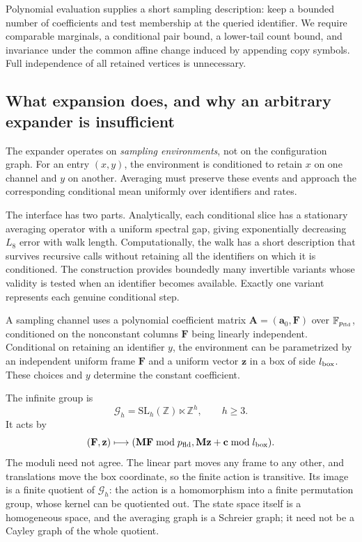 \documentclass[11pt]{article}
\numberwithin{equation}{section}
\theoremstyle{definition}
\theoremstyle{remark}
\begin{document}
Polynomial evaluation supplies a short sampling description: keep a bounded number of coefficients and test membership at the queried identifier. We require comparable marginals, a conditional pair bound, a lower-tail count bound, and invariance under the common affine change induced by appending copy symbols. Full independence of all retained vertices is unnecessary.

\subsection{What expansion does, and why an arbitrary expander is insufficient}

The expander operates on \emph{sampling environments}, not on the configuration graph. For an entry \((x,y)\), the environment is conditioned to retain \(x\) on one channel and \(y\) on another. Averaging must preserve these events and approach the corresponding conditional mean uniformly over identifiers and rates.

The interface has two parts. Analytically, each conditional slice has a stationary averaging operator with a uniform spectral gap, giving exponentially decreasing \(L_8\) error with walk length. Computationally, the walk has a short description that survives recursive calls without retaining all the identifiers on which it is conditioned. The construction provides boundedly many invertible variants whose validity is tested when an identifier becomes available. Exactly one variant represents each genuine conditional step.

A sampling channel uses a polynomial coefficient matrix \(\mathbf A=(\mathbf a_0,\mathbf F)\) over \(\mathbb F_{p_{\rm fld}}\), conditioned on the nonconstant columns \(\mathbf F\) being linearly independent. Conditional on retaining an identifier \(y\), the environment can be parametrized by an independent uniform frame \(\mathbf F\) and a uniform vector \(\mathbf z\) in a box of side \(l_{\rm box}\). These choices and \(y\) determine the constant coefficient.

The infinite group is
\[
 \mathcal G_h=\mathrm{SL}_h(\mathbb Z)\ltimes\mathbb Z^h,\qquad h\geq3.
\]
It acts by
\[
 (\mathbf F,\mathbf z)\longmapsto
 (\mathbf M\mathbf F\bmod p_{\rm fld},
       \mathbf M\mathbf z+\mathbf c\bmod l_{\rm box}).
\]
The moduli need not agree. The linear part moves any frame to any other, and translations move the box coordinate, so the finite action is transitive. Its image is a finite quotient of \(\mathcal G_h\): the action is a homomorphism into a finite permutation group, whose kernel can be quotiented out. The state space itself is a homogeneous space, and the averaging graph is a Schreier graph; it need not be a Cayley graph of the whole quotient.
\end{document}

